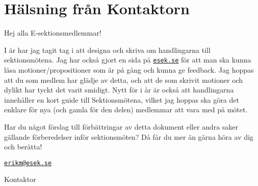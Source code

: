\documentclass[../_main/handlingar.tex]{subfiles}
\begin{document}
\section{Hälsning från Kontaktorn}
Hej alla E-sektionsmedlemmar!

I år har jag tagit tag i att designa och skriva om handlingarna till sektionsmötena. Jag har också gjort en sida på \href{http://eee.esek.se}{\texttt{esek.se}} för att man ska kunna läsa motioner/propositioner som är på gång och kunna ge feedback. Jag hoppas att du som medlem har glädje av detta, och att de som skrivit motioner och dylikt har tyckt det varit smidigt. Nytt för i år är också att handlingarna innehåller en kort guide till Sektionsmötena, vilket jag hoppas ska göra det enklare för nya (och gamla för den delen) medlemmar att vara med på mötet.

Har du något förslag till förbättringar av detta dokument eller andra saker gällande förberedelser inför sektionsmöten? Då får du mer än gärna höra av dig och berätta!

\href{mailto:erikm@esek.se}{\texttt{erikm@esek.se}}

\begin{signatures}{1}
    \mvh
    \signature{\sekr}{Kontaktor}
\end{signatures}
\end{document}
